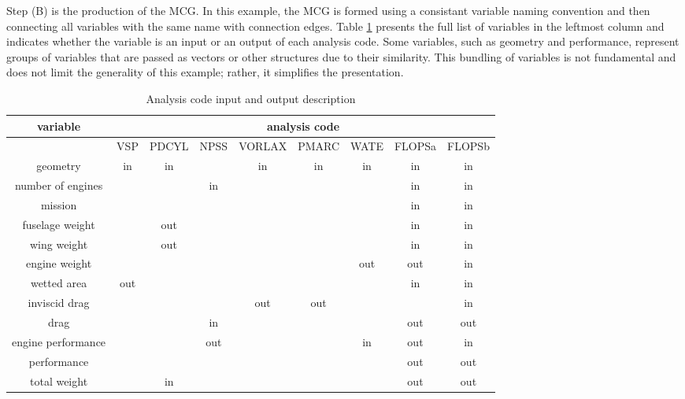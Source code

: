 Step (B) is the production of the MCG.
	In this example, the MCG is formed using a consistant variable naming convention and then connecting all variables with the same name with connection edges. 
	Table \ref{t:ins and outs} presents the full list of variables in the leftmost column and indicates whether the variable is an input or an output of each analysis code. 
	Some variables, such as geometry and performance, represent groups of variables that are passed as vectors or other structures due to their similarity. 
	This bundling of variables is not fundamental and does not limit the generality of this example; rather, it simplifies the presentation.
	\begin{table}[htb!]
	  \centering
	  \caption{Analysis code input and output description}
		\begin{tabular}{ccccccccc}
		\toprule
		variable & \multicolumn{8}{c}{analysis code} \\
		\midrule
			  & VSP   & PDCYL & NPSS  & VORLAX & PMARC & WATE  & FLOPSa & FLOPSb \\
		geometry & in    & in    &       & in    & in    & in    & in    & in \\
		number of engines &       &       & in    &       &       &       & in    & in \\
		mission &       &       &       &       &       &       & in    & in \\
		fuselage weight &       & out   &       &       &       &       & in    & in \\
		wing weight &       & out   &       &       &       &       & in    & in \\
		engine weight &       &       &       &       &       & out   & out   & in \\
		wetted area & out   &       &       &       &       &       & in    & in \\
		inviscid drag &       &       &       & out   & out   &       &       & in \\
		drag  &       &       & in    &       &       &       & out   & out \\
		engine performance &       &       & out   &       &       & in    & out   & in \\
		performance &       &       &       &       &       &       & out   & out \\
		total weight &       & in    &       &       &       &       & out   & out \\
		\bottomrule
		\end{tabular}
	  \label{t:ins and outs}
	\end{table}

